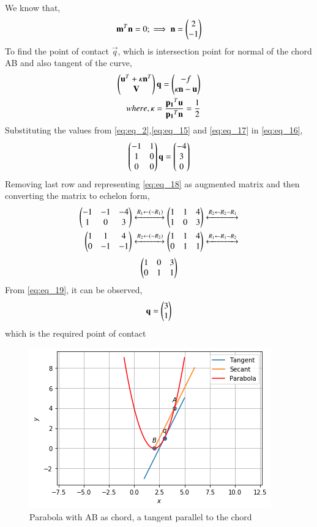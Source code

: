 \documentclass[journal,12pt,twocolumn]{IEEEtran}
\begin{document}
We know that,
\begin{align} \label{eq:eq_15}
    \mathbf{m}^T\mathbf{n} = 0; \implies \mathbf{n} = \begin{pmatrix}2 \\ -1\end{pmatrix} 
\end{align}
To find the point of contact $\vec{q}$, which is intersection point for normal of the chord AB and also tangent of the curve,
\begin{align}
    \begin{pmatrix}\mathbf{u}^T+\kappa\mathbf{n}^T \\ \mathbf{V}\end{pmatrix}\mathbf{q}=\begin{pmatrix}-f \\ \kappa\mathbf{n} - \mathbf{u}\end{pmatrix} \label{eq:eq_16} \\
    where, \kappa = \frac{\mathbf{p_1}^T\mathbf{u}}{\mathbf{p_1}^T\mathbf{n}} = \frac{1}{2} \label{eq:eq_17}
\end{align}
Substituting the values from \eqref{eq:eq_2},\eqref{eq:eq_15} and \eqref{eq:eq_17} in \eqref{eq:eq_16},
\begin{align}
    \begin{pmatrix}-1 & 1 \\ 1 & 0 \\ 0 & 0\end{pmatrix}\mathbf{q} = \begin{pmatrix}-4 \\ 3 \\ 0\end{pmatrix} \label{eq:eq_18}
\end{align}
Removing last row and representing \eqref{eq:eq_18} as augmented matrix and then converting the matrix to echelon form,
\begin{align}
    \begin{pmatrix}-1 & -1 & -4 \\ 1 & 0 & 3\end{pmatrix} \xleftrightarrow[]{R_1\leftarrow(-R_1)} \begin{pmatrix}1 & 1 & 4 \\ 1 & 0 & 3\end{pmatrix} \xleftrightarrow[]{R_2\leftarrow R_2-R_1} \nonumber \\
    \begin{pmatrix}1 & 1 & 4 \\ 0 & -1 & -1\end{pmatrix} \xleftrightarrow[]{R_2\leftarrow(-R_2)} \begin{pmatrix}1 & 1 & 4 \\ 0 & 1 & 1\end{pmatrix} \xleftrightarrow[]{R_1\leftarrow R_1-R_2} \nonumber 
\end{align}
\begin{align}
    \begin{pmatrix}1 & 0 & 3 \\ 0 & 1 & 1\end{pmatrix} \label{eq:eq_19}
\end{align}
From \eqref{eq:eq_19}, it can be observed,
\begin{align}
    \mathbf{q} = \begin{pmatrix}3 \\ 1\end{pmatrix}
\end{align}
which is the required point of contact
\renewcommand{\thefigure}{1}
\begin{figure}[ht!]
    \centering
    \includegraphics[width=\columnwidth]{Assignment_7_Plot.png}
    \caption{Parabola with AB as chord, a tangent parallel to the chord}
    \label{Fig:1}
\end{figure} 
\end{document}
